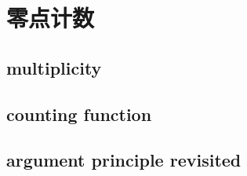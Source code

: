 \section{零点计数}
\label{b3:sec:1801}


\subsection{multiplicity}
\label{b3:subsec:180101}

\subsection{counting function}
\label{b3:subsec:180102}

\subsection{argument principle revisited}
\label{b3:subsec:180103}


